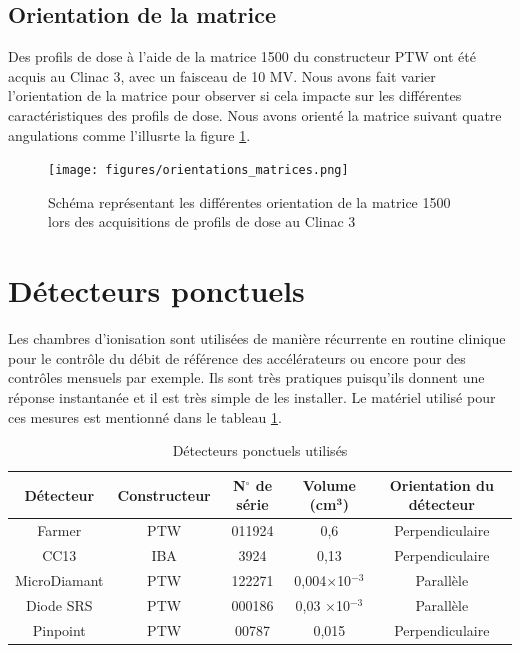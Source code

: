 \documentclass{book}
\begin{document}
\subsection{Orientation de la matrice}

Des profils de dose à l'aide de la matrice 1500 du constructeur PTW ont été acquis au Clinac 3, avec un faisceau de 10 MV. Nous avons fait varier l'orientation de la matrice pour observer si cela impacte sur les différentes caractéristiques des profils de dose. Nous avons orienté la matrice suivant quatre angulations comme l'illusrte la figure \ref*{fig_orientations_matrice}.

\begin{figure}[h]
  \centering
  \texttt{[image: figures/orientations\_matrices.png]}
  \caption{Schéma représentant les différentes orientation de la matrice 1500 lors des acquisitions de profils de dose au Clinac 3}
  \label{fig_orientations_matrice}
\end{figure}

\section{Détecteurs ponctuels}

Les chambres d'ionisation sont utilisées de manière récurrente en routine clinique pour le contrôle du débit de référence des accélérateurs ou encore pour des contrôles mensuels par exemple. Ils sont très pratiques puisqu'ils donnent une réponse instantanée et il est très simple de les installer. Le matériel utilisé pour ces mesures est mentionné dans le tableau \ref*{table_detecteurs_ponctuels}.

\begin{table}[h]
  \centering
  \begin{tabular}{ccccc}
    \toprule
    \textbf{Détecteur} & \textbf{Constructeur} &  \textbf{N}$\mathbf{^{\circ}}$ \textbf{de série} & \textbf{Volume (cm}$\mathbf{^3}$\textbf{)} & \textbf{Orientation du détecteur}\\
    \toprule
    Farmer & PTW & 011924 & 0,6 & Perpendiculaire \\
    CC13 & IBA & 3924 & 0,13 & Perpendiculaire \\
    MicroDiamant & PTW & 122271 & 0,004$\times$10$^{-3}$ & Parallèle \\
    Diode SRS & PTW & 000186 & 0,03 $\times$10$^{-3}$ & Parallèle \\
    Pinpoint & PTW & 00787 & 0,015 & Perpendiculaire \\
    \bottomrule
  \end{tabular}
  \caption{Détecteurs ponctuels utilisés}
  \label{table_detecteurs_ponctuels}
\end{table}
\end{document}
